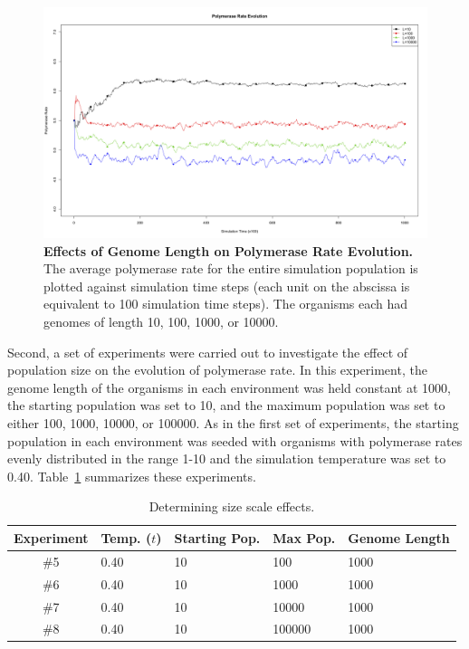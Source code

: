 \begin{figure}[h]
	\centering
		\includegraphics[width=\textwidth]{scale_length}
	\caption{\textbf{Effects of Genome Length on Polymerase Rate Evolution.} The average polymerase rate for the entire simulation population is plotted against simulation time steps (each unit on the abscissa is equivalent to 100 simulation time steps). The organisms each had genomes of length 10, 100, 1000, or 10000.}
	\label{fig:scale_length}
\end{figure}

Second, a set of experiments were carried out to investigate the effect of population size on the evolution of polymerase rate. In this experiment, the genome length of the organisms in each environment was held constant at 1000, the starting population was set to 10, and the maximum population was set to either 100, 1000, 10000, or 100000. As in the first set of experiments, the starting population in each environment was seeded with organisms with polymerase rates evenly distributed in the range 1-10 and the simulation temperature was set to 0.40. Table~\ref{tab:scale_num} summarizes these experiments.

\begin{table}
	\begin{center}
		\begin{tabular}[c]{ c | l | l | l | l }
			Experiment & Temp. ($t$) & Starting Pop. & Max Pop. & Genome Length \\
			\hline
			\#5 & 0.40 & 10 & 100 & 1000 \\
			\#6 & 0.40 & 10 & 1000 & 1000 \\
			\#7 & 0.40 & 10 & 10000 & 1000 \\
			\#8 & 0.40 & 10 & 100000 & 1000 \\
		\end{tabular}
		\caption{Determining size scale effects.}
		\label{tab:scale_num}
	\end{center}
\end{table}

